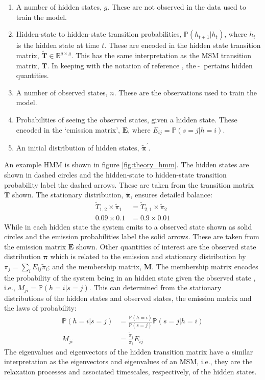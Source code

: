 \begin{enumerate}
    \item A number of hidden states, $g$. These are not observed in the data used to train the model.  
    \item Hidden-state to hidden-state transition probabilities, $\mathbb{P}(h_{t+1}|h_{t})$, where $h_{t}$ is the hidden state at time $t$. These are encoded in the hidden state transition matrix, $\widetilde{\mathbf{T}}\in \mathbb{R}^{g \times g}$. This has the same interpretation as the MSM transition matrix, $\mathbf{T}$. In keeping with the notation of reference \cite{noeProjectedHiddenMarkov2013a}, the $\ \widetilde{}\ $ pertains hidden quantities. 
    \item A number of observed states, $n$. These are the observations used to train the model. 
    \item Probabilities of seeing the observed states, given a hidden state. These encoded in the `emission matrix', $\mathbf{E}$, where  $E_{ij} = \mathbb{P}(s=j|h=i)$.  
    \item An initial distribution of hidden states, $\widetilde{\bm{\pi}}^{\prime}$.
\end{enumerate}

An example HMM is shown in figure \ref{fig:theory_hmm}. The hidden states are shown in dashed circles and the hidden-state to hidden-state transition probability label the dashed arrows. These are taken from the transition matrix $\widetilde{\mathbf{T}}$ shown. The stationary distribution, $\widetilde{\bm{\pi}}$, ensures detailed balance:
\begin{align*}
    \widetilde{T}_{1,2}\times \widetilde{\pi}_{1} & = \widetilde{T}_{2,1}\times \widetilde{\pi}_{2}\\
    0.09\times 0.1 & = 0.9 \times 0.01
\end{align*}
While in each hidden state the system emits to a observed state shown as solid circles and the emission probabilities label the solid arrows. These are taken from the  emission matrix $\mathbf{E}$ shown. Other quantities of interest are the observed state distribution $\bm{\pi}$ which is related to the emission and  stationary distribution by $\pi_{j} = \sum_{i}E_{ij}\widetilde{\pi}_{i}$;  and the membership matrix, $\mathbf{M}$. The membership matrix encodes the probability of the system being in an hidden state given the observed state \cite{noeProjectedHiddenMarkov2013a}, i.e., $M_{ji}=\mathbb{P}(h=i|s=j)$. This can determined from the stationary distributions of the hidden states and observed states, the emission matrix and the laws of probability:
\begin{align}
    \mathbb{P}(h=i|s=j) &= \frac{\mathbb{P}(h=i)}{\mathbb{P}(s=j)}\mathbb{P}(s=j|h=i) \\
    M_{ji} &= \frac{\widetilde{\pi}_j}{\pi_i}E_{ij}
\end{align}
The eigenvalues and eigenvectors of the hidden transition matrix have a similar interpretation as the eigenvectors and eigenvalues of an MSM, i.e., they are the relaxation processes and associated timescales, respectively, of the hidden states. 

